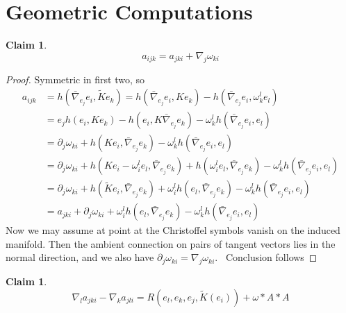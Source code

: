 \documentclass[12pt,letterpaper]{amsart}%
\newcounter{mycounter}
\numberwithin{mycounter}{section}
\theoremstyle{plain}
\newtheorem{claim}[mycounter]{Claim}
\numberwithin{equation}{section}
\theoremstyle{definition}
\begin{document}
\section{Geometric Computations}

\begin{claim}
\label{c0}%
\[
a_{ijk}=a_{jki}+\nabla_{j}\omega_{ki}%
\]

\end{claim}

\begin{proof}
Symmetric in first two, so
\begin{align*}
a_{ijk}  &  =h(\bar{\nabla}_{e_{j}}e_{i},\tilde{K}e_{k})=h(\bar{\nabla}%
_{e_{j}}e_{i},Ke_{k})-h(\bar{\nabla}_{e_{j}}e_{i},\omega_{k}^{l}e_{l})\\
&  =e_{j}h(e_{i},Ke_{k})-h(e_{i},K\bar{\nabla}_{e_{j}}e_{k})-\omega_{k}%
^{l}h(\bar{\nabla}_{e_{j}}e_{i},e_{l})\\
&  =\partial_{j}\omega_{ki}+h(Ke_{i},\bar{\nabla}_{e_{j}}e_{k})-\omega_{k}%
^{l}h(\bar{\nabla}_{e_{j}}e_{i},e_{l})\\
&  =\partial_{j}\omega_{ki}+h(Ke_{i}-\omega_{i}^{l}e_{l},\bar{\nabla}_{e_{j}%
}e_{k})+h(\omega_{i}^{l}e_{l},\bar{\nabla}_{e_{j}}e_{k})-\omega_{k}^{l}%
h(\bar{\nabla}_{e_{j}}e_{i},e_{l})\\
&  =\partial_{j}\omega_{ki}+h(\tilde{K}e_{i},\bar{\nabla}_{e_{j}}e_{k}%
)+\omega_{i}^{l}h(e_{l},\bar{\nabla}_{e_{j}}e_{k})-\omega_{k}^{l}h(\bar
{\nabla}_{e_{j}}e_{i},e_{l})\\
&  =a_{jki}+\partial_{j}\omega_{ki}+\omega_{i}^{l}h(e_{l},\bar{\nabla}_{e_{j}%
}e_{k})-\omega_{k}^{l}h(\bar{\nabla}_{e_{j}}e_{i},e_{l})
\end{align*}
Now we may assume at point at the Christoffel symbols vanish on the induced
manifold. Then the ambient connection on pairs of tangent vectors lies in the
normal direction, and we also have $\partial_{j}\omega_{ki}=\nabla_{j}%
\omega_{ki}.$ \ Conclusion follows
\end{proof}








\begin{claim}
\bigskip\label{c3}%
\[
\nabla_{l}a_{jki}-\nabla_{k}a_{jli}=R(e_{l},e_{k},e_{j},\tilde{K}%
(e_{i}))+\omega\ast A\ast A
\]

\end{claim}
\end{document}
